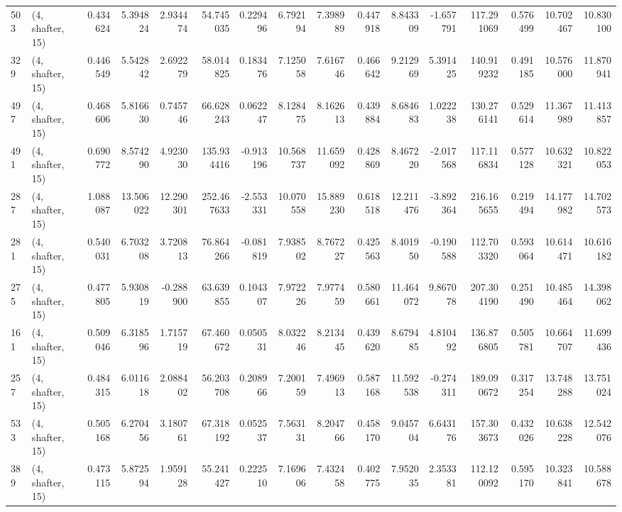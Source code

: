 \begin{tabular}{llrrrrrrrrrrrrrr}
503 &  (4, shafter, 15) &   0.434624 &   5.394824 &   2.934474 &    54.745035 &   0.229496 &   6.792194 &   7.398989 &  0.447918 &   8.843309 &  -1.657791 &    117.291069 &   0.576499 &   10.702467 &   10.830100 \\
329 &  (4, shafter, 15) &   0.446549 &   5.542842 &   2.692279 &    58.014825 &   0.183476 &   7.125058 &   7.616746 &  0.466642 &   9.212969 &   5.391425 &    140.919232 &   0.491185 &   10.576000 &   11.870941 \\
497 &  (4, shafter, 15) &   0.468606 &   5.816630 &   0.745746 &    66.628243 &   0.062247 &   8.128475 &   8.162613 &  0.439884 &   8.684683 &   1.022238 &    130.276141 &   0.529614 &   11.367989 &   11.413857 \\
491 &  (4, shafter, 15) &   0.690772 &   8.574290 &   4.923030 &   135.934416 &  -0.913196 &  10.568737 &  11.659092 &  0.428869 &   8.467220 &  -2.017568 &    117.116834 &   0.577128 &   10.632321 &   10.822053 \\
287 &  (4, shafter, 15) &   1.088087 &  13.506022 &  12.290301 &   252.467633 &  -2.553331 &  10.070558 &  15.889230 &  0.618518 &  12.211476 &  -3.892364 &    216.165655 &   0.219494 &   14.177982 &   14.702573 \\
281 &  (4, shafter, 15) &   0.540031 &   6.703208 &   3.720813 &    76.864266 &  -0.081819 &   7.938502 &   8.767227 &  0.425563 &   8.401950 &  -0.190588 &    112.703320 &   0.593064 &   10.614471 &   10.616182 \\
275 &  (4, shafter, 15) &   0.477805 &   5.930819 &  -0.288900 &    63.639855 &   0.104307 &   7.972226 &   7.977459 &  0.580661 &  11.464072 &   9.867078 &    207.304190 &   0.251490 &   10.485464 &   14.398062 \\
161 &  (4, shafter, 15) &   0.509046 &   6.318596 &   1.715719 &    67.460672 &   0.050531 &   8.032246 &   8.213445 &  0.439620 &   8.679485 &   4.810492 &    136.876805 &   0.505781 &   10.664707 &   11.699436 \\
257 &  (4, shafter, 15) &   0.484315 &   6.011618 &   2.088402 &    56.203708 &   0.208966 &   7.200159 &   7.496913 &  0.587168 &  11.592538 &  -0.274311 &    189.090672 &   0.317254 &   13.748288 &   13.751024 \\
533 &  (4, shafter, 15) &   0.505168 &   6.270456 &   3.180761 &    67.318192 &   0.052537 &   7.563131 &   8.204766 &  0.458170 &   9.045704 &   6.643176 &    157.303673 &   0.432026 &   10.638228 &   12.542076 \\
389 &  (4, shafter, 15) &   0.473115 &   5.872594 &   1.959128 &    55.241427 &   0.222510 &   7.169606 &   7.432458 &  0.402775 &   7.952035 &   2.353381 &    112.120092 &   0.595170 &   10.323841 &   10.588678 \\

\end{tabular}
